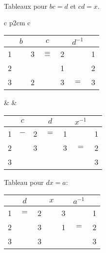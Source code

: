 \begin{ex}
       Tableaux pour $bc = d$ et $cd = x$.
       \begin{center}
         \begin{tabular}{c p{2cm} c}
           \begin{tabular}{|ccccccc|}
             \hline
               & $b$ &   & $c$ &   & $d^{-1}$ & \\
             \hline
             1 &     & 3 & $\equiv$ & 2 &    & 1\\
             2 &     &   &     & 1 &         & 2\\
             3 &     & 2 &     & 3 &   $=$   & 3\\
             \hline
           \end{tabular}
               & &
                   \begin{tabular}{|ccccccc|}
                     \hline
                       & $c$ &   & $d$ &   & $x^{-1}$ & \\
                     \hline
                     1 & $-$ & 2 & $=$ & 1 &         & 1\\
                     2 &     & 3 &     & 3 & $=$     & 2\\
                     3 &     &   &     &   &         & 3\\
                     \hline
                   \end{tabular}
         \end{tabular}
       \end{center}

       Tableau pour $dx = a$:
       \begin{center}
         \begin{tabular}{|ccccccc|}
           \hline
             & $d$ &   & $x$ &   & $a^{-1}$ & \\
           \hline
           1 & $=$ & 2 &     & 3 &         & 1\\
           2 &     & 3 &     & 1 &   $=$   & 2\\
           3 &     & 3 &     &   &         & 3\\
           \hline
         \end{tabular}
       \end{center}
       

\end{ex}
